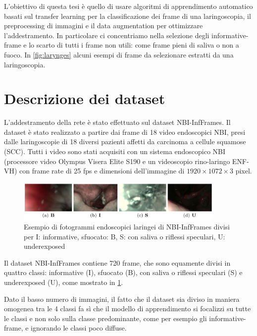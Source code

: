 L'obiettivo di questa tesi è quello di usare algoritmi di apprendimento automatico basati sul transfer learning per la classificazione dei frame di una laringoscopia, il  preprocessing di immagini e il data augmentation per ottimizzare l'addestramento. In particolare ci concentriamo nella selezione degli informative-frame e lo scarto di tutti i frame non utili: come frame pieni di saliva o non a fuoco. In \cref{fig:larynges} alcuni esempi di frame da selezionare estratti da una laringoscopia.

\section{Descrizione dei dataset}\label{descrizione-dei-dataset}

L'addestramento della rete è stato effettuato  sul dataset
NBI-InfFrames. Il dataset
è stato realizzato a partire dai frame di 18 video endoscopici NBI, presi dalle laringoscopie di
18 diversi pazienti affetti da carcinoma a cellule squamose
(SCC). Tutti i video sono stati acquisiti con un sistema endoscopico
NBI (processore video Olympus Visera Elite S190 e
un videoscopio rino-laringo ENF-VH) con frame rate di
25 fps e dimensioni dell'immagine di \(1920\times 1072\times 3\) pixel.

\begin{figure}[ht]
    \centering
    \includegraphics[width=0.9\textwidth]{introduzione/Larynge.jpg}
    \caption[Esempio di fotogrammi endoscopici laringei di NBI-InfFrames]{Esempio di fotogrammi endoscopici laringei di NBI-InfFrames divisi per I: informative, sfuocato: B, S: con
    saliva o riflessi speculari,
    U: underexposed}
    \label{fig:larynges-2}
\end{figure}

Il dataset NBI-InfFrames contiene 720 frame, che sono equamente divisi in quattro classi: informative (I), sfuocato (B), con saliva o riflessi speculari (S) e underexposed  (U), come mostrato in \cref{fig:larynges-2}. 

Dato il basso numero di immagini, il fatto che il dataset sia diviso in maniera omogenea tra le 4 classi fa sì che il modello di apprendimento si focalizzi su tutte le classi e non solo sulla classe predominante, come per esempio gli informative-frame, e ignorando le classi poco diffuse.

